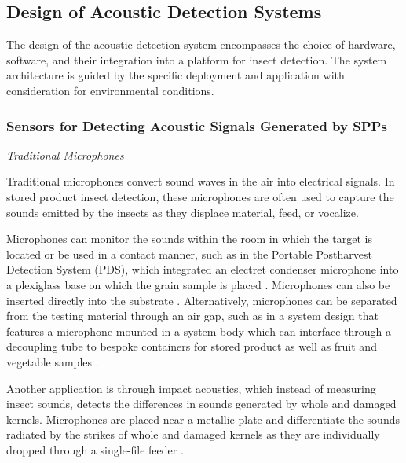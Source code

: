 \documentclass[../Vibro-Acoustic Signatures and Detection Algorithms for Stored Product Insects.tex]{subfiles}
\begin{document}
\newpage
\subsection{Design of Acoustic Detection Systems}

The design of the acoustic detection system encompasses the choice of hardware, software, and their integration into a platform for insect detection. The system architecture is guided by the specific deployment and application with consideration for environmental conditions.

\subsubsection[Sensors for Detecting Acoustic Signals Generated by Stored Product Pests]{Sensors for Detecting Acoustic Signals Generated by SPPs}

\textit{Traditional Microphones}

Traditional microphones convert sound waves in the air into electrical signals. In stored product insect detection, these microphones are often used to capture the sounds emitted by the insects as they displace material, feed, or vocalize.

Microphones can monitor the sounds within the room in which the target is located \cite{brandingInsectSound1000InsectSound2024} or be used in a contact manner, such as in the Portable Postharvest Detection System (PDS), which integrated an electret condenser microphone into a plexiglass base on which the grain sample is placed \cite{mankinPerformanceLowCostAcoustic2020}. Microphones can also be inserted directly into the substrate \cite{njorogeFrequencyTimePattern2016}. Alternatively, microphones can be separated from the testing material through an air gap, such as in a system design that features a microphone mounted in a system body which can interface through a decoupling tube to bespoke containers for stored product as well as fruit and vegetable samples \cite{vickSoundDetectionStoredProduct1988,webbAcousticalSystemDetect1988}.

Another application is through impact acoustics, which instead of measuring insect sounds, detects the differences in sounds generated by whole and damaged kernels. Microphones are placed near a metallic plate and differentiate the sounds radiated by the strikes of whole and damaged kernels as they are individually dropped through a single-file feeder \cite{bueranoMicrophoneSystemOptimization2012,pearsonFeasibilityImpactacousticEmissions2007}.
\end{document}
